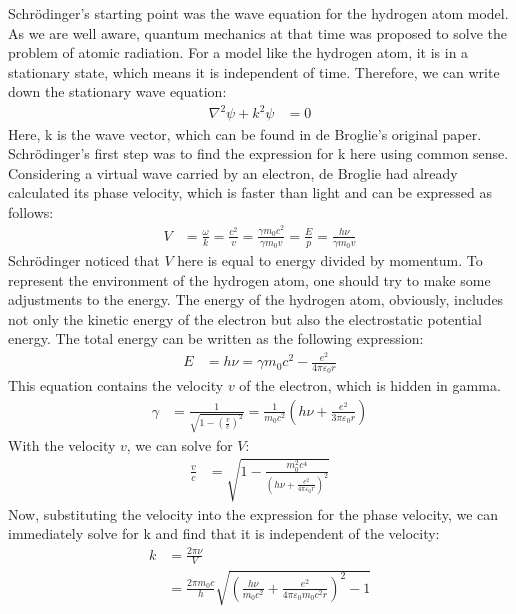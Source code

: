 \documentclass[a4paper, 12pt, oneside, onecolumn]{article}
\begin{document}
\begin{multicols}{2}
Schrödinger's starting point was the wave equation for the hydrogen atom model. As we are well aware, quantum mechanics at that time was proposed to solve the problem of atomic radiation. For a model like the hydrogen atom, it is in a stationary state, which means it is independent of time. Therefore, we can write down the stationary wave equation:
\begin{align}
	\nabla^2 \psi + k^2 \psi
	&= 0
\end{align}
Here, k is the wave vector, which can be found in de Broglie's original paper\cite{refId0}. Schrödinger's first step was to find the expression for k here using common sense. Considering a virtual wave carried by an electron, de Broglie had already calculated its phase velocity, which is faster than light and can be expressed as follows:
\begin{align}
	V
	&= \frac{\omega}{k} = \frac{c^2}{v} = \frac{\gamma m_0 c^2}{\gamma m_0 v} = \frac{E}{p} = \frac{h \nu}{\gamma m_0 v}
\end{align}
Schrödinger noticed that $V$ here is equal to energy divided by momentum. To represent the environment of the hydrogen atom, one should try to make some adjustments to the energy. The energy of the hydrogen atom, obviously, includes not only the kinetic energy of the electron but also the electrostatic potential energy. The total energy can be written as the following expression:
\begin{align}
	E
	&= h \nu = \gamma m_0 c^2 - \frac{e^2}{4 \pi \varepsilon_0 r}
\end{align}
This equation contains the velocity $v$ of the electron, which is hidden in gamma.
\begin{align}
	\gamma
	&= \frac{1}{\sqrt{1 - \left( \frac{v}{c} \right)^2}} = \frac{1}{m_0 c^2} \left( h \nu + \frac{e^2}{3 \pi \varepsilon_0 r} \right)
\end{align}
With the velocity $v$, we can solve for $V$:
\begin{align}
	\frac{v}{c}
	&= \sqrt{1 - \frac{m_0^2 c^4}{\left( h \nu + \frac{e^2}{4 \pi \varepsilon_0 r} \right)^2}}
\end{align}
Now, substituting the velocity into the expression for the phase velocity, we can immediately solve for k and find that it is independent of the velocity:
\begin{align}
	k
	&= \frac{2 \pi \nu}{V} \nonumber \\
	&= \frac{2 \pi m_0 c}{h} \sqrt{\left( \frac{h \nu}{m_0 c^2} + \frac{e^2}{4 \pi \varepsilon_0 m_0 c^2 r} \right)^2 - 1}

\end{align}
\end{multicols}
\end{document}
